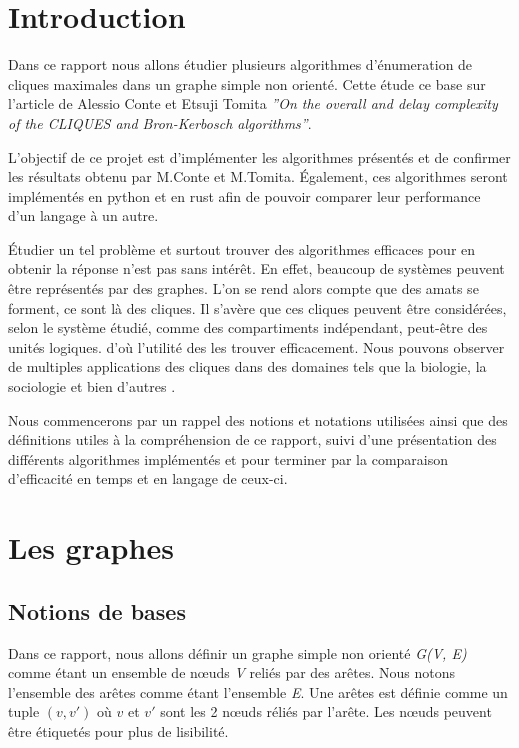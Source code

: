 \documentclass[12pt,a4paper]{article}
\begin{document}
\tableofcontents

\newpage

\section{Introduction}


Dans ce rapport nous allons étudier plusieurs algorithmes d'énumeration de cliques maximales dans un graphe simple non orienté. Cette étude ce base sur l'article de Alessio Conte et Etsuji Tomita  \textit{''On the overall and delay complexity of the CLIQUES and Bron-Kerbosch algorithms''}.

L'objectif de ce projet est d'implémenter les algorithmes présentés et de confirmer les résultats obtenu par M.Conte et M.Tomita. Également, ces algorithmes seront implémentés en python et en rust afin de pouvoir comparer leur performance d'un langage à un autre.

Étudier un tel problème et surtout trouver des algorithmes efficaces pour en obtenir la réponse n'est pas sans intérêt. En effet, beaucoup de systèmes peuvent être représentés par des graphes. L'on se rend alors compte que des amats se forment, ce sont là des cliques. Il s'avère que ces cliques peuvent être considérées, selon le système étudié, comme des compartiments indépendant, peut-être des unités logiques. d'où l'utilité des les trouver efficacement. Nous pouvons observer de multiples applications des cliques dans des domaines tels que la biologie, la sociologie et bien d'autres \cite{FORTUNATO201075}.

Nous commencerons par un rappel des notions et notations utilisées ainsi que des définitions utiles à la compréhension de ce rapport, suivi d'une présentation des différents algorithmes implémentés et pour terminer par la comparaison d'efficacité en temps et en langage de ceux-ci.

\section{Les graphes}%
\label{sec:graphes}

\subsection{Notions de bases}

Dans ce rapport, nous allons définir un graphe simple non orienté \emph{G(V, E)} comme étant un ensemble de nœuds \emph{V} reliés par des arêtes. Nous notons l'ensemble des arêtes comme étant l'ensemble \emph{E}. Une arêtes est définie comme un tuple $ (v, v') $ où $ v $ et $ v' $ sont les 2 nœuds réliés par l'arête. Les nœuds peuvent être étiquetés pour plus de lisibilité.
\end{document}
